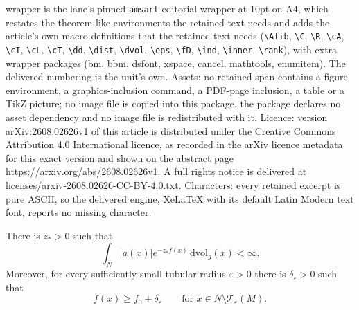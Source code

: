 \documentclass[10pt,a4paper]{amsart}
\newcommand{\cT}{\mathcal{T}}
\newcommand{\dvol}{\,\mathrm{dvol}}
\newcommand{\eps}{\varepsilon}
\begin{document}
wrapper is the lane's pinned \texttt{amsart} editorial wrapper at 10pt on A4, which restates the theorem-like environments the retained text needs and adds the article's own macro definitions that the retained text needs (\texttt{\textbackslash Afib}, \texttt{\textbackslash C}, \texttt{\textbackslash R}, \texttt{\textbackslash cA}, \texttt{\textbackslash cI}, \texttt{\textbackslash cL}, \texttt{\textbackslash cT}, \texttt{\textbackslash dd}, \texttt{\textbackslash dist}, \texttt{\textbackslash dvol}, \texttt{\textbackslash eps}, \texttt{\textbackslash fD}, \texttt{\textbackslash ind}, \texttt{\textbackslash inner}, \texttt{\textbackslash rank}), with extra wrapper packages (bm, bbm, dsfont, xspace, cancel, mathtools, enumitem). The delivered numbering is the unit's own. Assets: no retained span contains a figure environment, a graphics-inclusion command, a PDF-page inclusion, a table or a TikZ picture; no image file is copied into this package, the package declares no asset dependency and no image file is redistributed with it. Licence: version arXiv:2608.02626v1 of this article is distributed under the Creative Commons Attribution 4.0 International licence, as recorded in the arXiv licence metadata for this exact version and shown on the abstract page https://arxiv.org/abs/2608.02626v1. A full rights notice is delivered at licenses/arxiv-2608.02626-CC-BY-4.0.txt. Characters: every retained excerpt is pure ASCII, so the delivered engine, XeLaTeX with its default Latin Modern text font, reports no missing character.
\begin{assumption}\label{ass:global}
There is $z_*>0$ such that
\begin{equation}\label{eq:A0}
  \int_N |a(x)|e^{-z_*f(x)}\dvol_g(x)<\infty.
\end{equation}
Moreover, for every sufficiently small tubular radius $\eps>0$ there is
$\delta_\eps>0$ such that
\begin{equation}\label{eq:A1}
  f(x)\ge f_0+\delta_\eps
  \qquad\text{for }x\in N\setminus \cT_\eps(M).
\end{equation}
\end{assumption}
\end{document}
